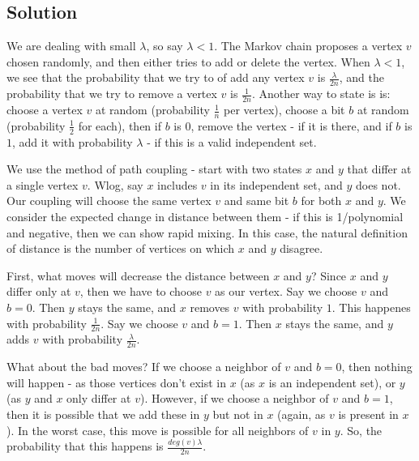 \documentclass{article}
\begin{document}
\subsection*{Solution}
  We are dealing with small $\lambda$, so say $\lambda < 1$.
  The Markov chain proposes a vertex $v$ chosen randomly, and then either
  tries to add or delete the vertex.  When $\lambda < 1$, we see that the
  probability that we try to of add any vertex $v$ is $\frac{\lambda}{2n}$,
  and the probability that we try to remove a vertex $v$ is $\frac{1}{2n}$.
  Another way to state is is: choose a vertex $v$ at random (probability
  $\frac{1}{n}$ per vertex), choose a bit $b$ at random (probability $\frac12$
  for each), then if $b$ is $0$, remove the vertex  - if it is there, and if $b$
  is $1$, add it with probability $\lambda$ - if this is a valid independent
  set.

    \vspace{3mm}
  We use the method of path coupling - start with two states $x$ and $y$ that
  differ at a single vertex $v$. Wlog, say $x$ includes $v$ in its independent
  set, and $y$ does not.  Our coupling will choose the same vertex $v$
  and same bit $b$ for both $x$ and $y$.  We consider the expected change in
  distance between them - if this is 1/polynomial and negative, then we can
  show rapid mixing.  In this case, the natural definition of distance is the
  number of vertices on which $x$ and $y$ disagree.

    \vspace{3mm}
  First, what moves will decrease the distance between $x$ and $y$?
  Since $x$ and $y$ differ only at $v$, then we have to choose $v$ as our
  vertex. Say we choose $v$ and $b=0$. Then $y$ stays the same, and $x$
  removes $v$ with probability $1$. This happenes with probability
  $\frac{1}{2n}$. Say we choose $v$ and $b=1$. Then $x$ stays the same, and
  $y$ adds $v$ with probability $\frac{\lambda}{2n}$.

    \vspace{3mm}
  What about the bad moves? If we choose a neighbor of $v$ and $b=0$, then
  nothing will happen - as those vertices don't exist in $x$ (as $x$ is an
  independent set), or $y$ (as $y$ and $x$ only differ at $v$).
  However, if we choose a neighbor of $v$ and $b=1$, then it is possible that
  we add these in $y$ but not in $x$ (again, as $v$ is present in $x$).
  In the worst case, this move is possible for all neighbors of $v$ in $y$.
  So, the probability that this happens is $\frac{deg(v)\lambda}{2n}$.
\end{document}
